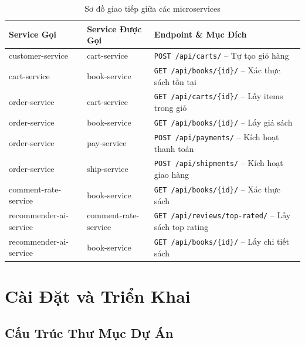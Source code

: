 \documentclass[12pt,a4paper]{article}
\begin{document}
\begin{table}[H]
  \centering
  \caption{Sơ đồ giao tiếp giữa các microservices}
  \begin{tabularx}{\textwidth}{llX}
    \toprule
    \textbf{Service Gọi} & \textbf{Service Được Gọi} & \textbf{Endpoint \& Mục Đích} \\
    \midrule
    customer-service     & cart-service           & \texttt{POST /api/carts/} -- Tự tạo giỏ hàng \\
    cart-service         & book-service           & \texttt{GET /api/books/\{id\}/} -- Xác thực sách tồn tại \\
    order-service        & cart-service           & \texttt{GET /api/carts/\{id\}/} -- Lấy items trong giỏ \\
    order-service        & book-service           & \texttt{GET /api/books/\{id\}/} -- Lấy giá sách \\
    order-service        & pay-service            & \texttt{POST /api/payments/} -- Kích hoạt thanh toán \\
    order-service        & ship-service           & \texttt{POST /api/shipments/} -- Kích hoạt giao hàng \\
    comment-rate-service & book-service           & \texttt{GET /api/books/\{id\}/} -- Xác thực sách \\
    recommender-ai-service & comment-rate-service & \texttt{GET /api/reviews/top-rated/} -- Lấy sách top rating \\
    recommender-ai-service & book-service         & \texttt{GET /api/books/\{id\}/} -- Lấy chi tiết sách \\
    \bottomrule
  \end{tabularx}
\end{table}

\section{Cài Đặt và Triển Khai}

\subsection{Cấu Trúc Thư Mục Dự Án}
\end{document}

